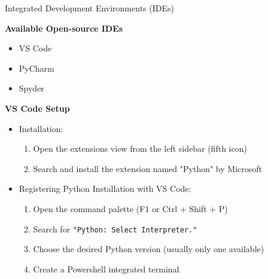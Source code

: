 \documentclass[
	11pt, 
]{beamer}
\begin{document}
\begin{frame}{Integrated Development Environments (IDEs)}
\begin{exampleblock}{\textbf{Available Open-source IDEs}}
\begin{itemize}
    \item VS Code 

    \item PyCharm

    \item Spyder
\end{itemize}
\end{exampleblock}

\textbf{VS Code Setup}

\begin{itemize}
    \item Installation:
    \begin{enumerate}
        \item  Open the extensions view from the left sidebar (fifth icon)
        \item Search and install the extension named "Python" by Microsoft
    \end{enumerate} \smallskip
    
    \item Registering Python Installation with VS Code:
    \begin{enumerate}
        \item Open the command palette (F1 or Ctrl + Shift + P)
        \item Search for \texttt{"Python: Select Interpreter."}
        \item Choose the desired Python version (usually only one available)
        \item Create a Powershell integrated terminal
     \end{enumerate}

     
\end{itemize}

\end{frame}

\end{document}
